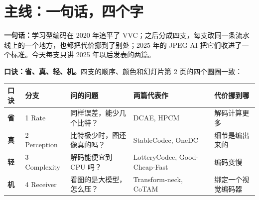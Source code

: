 
\begin{abstract}
这是幻灯片 \href{https://mejistus.github.io/\#post=Slides/Recent-Image-Compression.tex}{Recent Image Compression} 的提纲，给没有提词器、要脱稿讲完全场的情况用。
要背的只有三样：\textbf{第~\ref{sec:spine}~节}的一句主线和四字口诀；\textbf{第~\ref{sec:pages}~节}每页的“接”（过渡句）；以及每篇论文都按 Problem、Method、Result 三拍讲。
论文页上方是原论文的 pipeline 图，讲 Method 时指着图从左往右讲；数字、会议、年份都印在幻灯片上，指着读，不用背。
准备顺序：先能不看稿说出主线和四支的表；再对着幻灯片把第~\ref{sec:pages}~节出声讲两遍；最后只看幻灯片讲一遍，计时。
\end{abstract}

\section{主线：一句话，四个字}\label{sec:spine}

\textbf{一句话：}学习型编码在 2020 年追平了 VVC；之后分成四支，每支改同一条流水线上的一个地方，也都把代价挪到了别处；2025 年的 JPEG AI 把它们收进了一个标准。今天每支只讲 2025 年以后发表的两篇。

\textbf{口诀：省、真、轻、机。}四支的顺序、颜色和幻灯片第 2 页的四个圆圈一致：

\begin{center}
\begin{tabular}{lllll}
\toprule
口诀 & 分支 & 问的问题 & 两篇代表作 & 代价挪到哪 \\
\midrule
\textcolor{sig}{\textbf{省}} & 1 Rate & 同样误差，能少几个比特？ & DCAE, HPCM & 解码计算更多 \\
\textcolor{accent}{\textbf{真}} & 2 Perception & 比特极少时，图还像真的吗？ & StableCodec, OneDC & 细节是编出来的 \\
\textcolor{video}{\textbf{轻}} & 3 Complexity & 解码能便宜到 CPU 吗？ & LotteryCodec, Good-Cheap-Fast & 编码变慢 \\
\textcolor{hot}{\textbf{机}} & 4 Receiver & 看图的是大模型，怎么压？ & Transform-neck, CoTAM & 绑定一个视觉编码器 \\
\bottomrule
\end{tabular}
\end{center}

